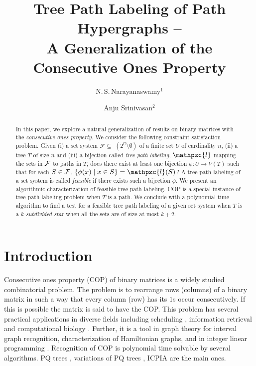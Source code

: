 \documentclass[11pt,
               envcountsect,
               envcountsame]
               {../lib/llncs2e/llncs}
\def\cF{{\cal F}}
\def\F{{\mathcal F}}
\def\cl{\mathpzc{l}}
\begin{document}
\mainmatter              %
\title{Tree Path Labeling of Path Hypergraphs --\\
  A Generalization of
  the Consecutive Ones Property} 
\author{N.\,S.\,Narayanaswamy$^1$ \and Anju Srinivasan$^{2}$}

\maketitle
\begin{abstract}
  In this paper, we explore a natural generalization of results on
  binary matrices with the {\em consecutive ones property}.  We
  consider the following constraint satisfaction problem. Given (i) a
  set system $\F \subseteq$ $(2^{U} \setminus \emptyset)$ of a finite
  set $U$ of cardinality $n$, (ii) a tree $T$ of size $n$ and (iii) a
  bijection called {\em tree path labeling}, $\cl$ mapping the sets in
  $\cF$ to paths in $T$, does there exist at least one bijection
  $\phi:U \rightarrow V(T)$ such that for each $S \in \cF$, $\{\phi(x)
  \mid x \in S\} = \cl(S)$?  A tree path labeling of a set system is
  called {\em feasible} if there exists such a bijection $\phi$.  We
  present an algorithmic characterization of feasible tree path
  labeling. COP is a special instance of tree path labeling problem
  when $T$ is a path.  We conclude with a polynomial time algorithm to
  find a test for a feasible tree path labeling of a given set system when $T$ is
  a {\em $k$-subdivided star} when all the sets are of size at most $k+2$.

\end{abstract}
\section{Introduction}
Consecutive ones property (COP) of binary matrices is a widely studied
combinatorial problem. The problem is to rearrange rows (columns) of a
binary matrix in such a way that every column (row) has its $1$s occur
consecutively. If this is possible the matrix is said to have the COP.
This problem has several practical applications in diverse fields
including scheduling \cite{hl06}, information retrieval \cite{k77} and
computational biology \cite{abh98}.  Further, it is a tool in graph
theory \cite{mcg04} for interval graph recognition, characterization
of Hamiltonian graphs, and in integer linear programming
\cite{ht02,hl06}.  Recognition of COP is polynomial time solvable by
several algorithms. PQ trees \cite{bl76}, variations of PQ trees
\cite{mm09,wlh01,wlh02,mcc04}, ICPIA \cite{nsnrs09} are the main ones.
\end{document}
